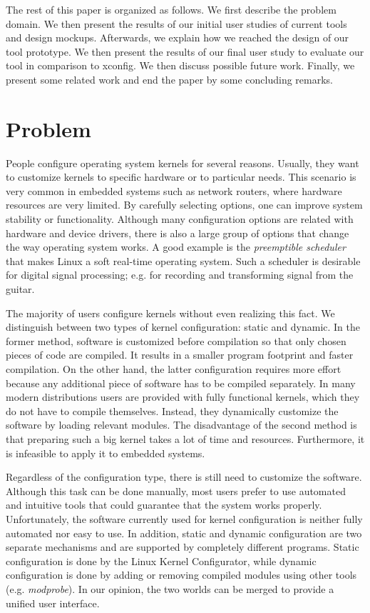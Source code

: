 \documentclass{chi2009}
\begin{document}
The rest of this paper is organized as follows. We first describe the problem domain. We then present the results of our initial user studies of current tools
and design mockups. Afterwards, we explain how we reached the design of our tool prototype. We then present the results of our final user study to evaluate our
tool in comparison to \textsf{xconfig}. We then discuss possible future work. Finally, we present some related work and end the paper by some concluding
remarks.

\section{Problem}\label{sec:problem}

People configure operating system kernels for several reasons. Usually, they want to customize kernels to specific hardware or to particular needs. This
scenario is very common in embedded systems such as network routers, where hardware resources are very limited. By carefully selecting options, one can improve
system stability or functionality. Although many configuration options are related with hardware and device drivers, there is also a large group of options that
change the way operating system works. A good example is the \textit{preemptible scheduler} that makes Linux a soft real-time
operating system. Such a scheduler is desirable for digital signal processing; e.g. for recording and transforming signal from the guitar.

The majority of users configure kernels without even realizing this fact. We distinguish between two types of kernel configuration: static and dynamic. In the
former method, software is customized before compilation so that only chosen pieces of code are compiled. It results in a smaller program footprint and faster
compilation. On the other hand, the latter configuration requires more effort because any additional piece of software has to be compiled separately. In many
modern distributions users are provided with fully functional kernels, which they do not have to compile themselves. Instead, they dynamically customize the
software by loading relevant modules. The disadvantage of the second method is that preparing such a big kernel takes a lot of time and resources. Furthermore,
it is infeasible to apply it to embedded systems.

Regardless of the configuration type, there is still need to customize the software. Although this task can be done manually, most users prefer to use automated
and intuitive tools that could guarantee that the system works properly. Unfortunately, the software currently used for kernel configuration is neither fully
automated nor easy to use. In addition, static and dynamic configuration are two separate mechanisms and are supported by completely different programs. Static
configuration is done by the Linux Kernel Configurator, while dynamic configuration is done by adding or removing compiled modules using other tools (e.g.
\textit{modprobe}). In our opinion, the two worlds can be merged to provide a unified user interface.
\end{document}
